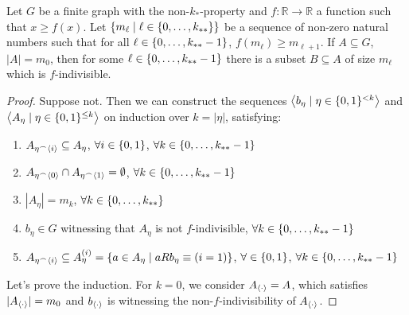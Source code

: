     \begin{lemma}[Claim 4.3] \label{lem:existance_of_indivisible_sets}
        Let $G$ be a finite graph with the non-$k_*$-property and $f: \mathbb{R} \longrightarrow \mathbb{R}$ a function
        such that $x \geq f(x)$.
        Let $\{ m_\ell \mid \ell \in \{ 0, \dots, k_{**} \} \}$ be a sequence of non-zero natural numbers such that
        for all $\ell \in \{ 0, \dots, k_{**}-1 \}$, $f(m_{\ell}) \geq m_{\ell+1}$.
        If $A \subseteq G$, $|A| = m_0$, then for some $\ell \in \{ 0, \dots, k_{**}-1 \}$ there is a subset $B \subseteq A$
        of size $m_\ell$ which is $f$-indivisible.
        \begin{proof}
            Suppose not.
            Then we can construct the sequences $\left< b_\eta \mid \eta \in \{ 0,1 \}^{<k} \right>$ and $\left< A_\eta \mid \eta \in \{ 0,1 \}^{\leq k} \right>$
            on induction over $k = |\eta|$, satisfying:
            \begin{enumerate}
                \item\label{itm:existance_of_indivisible_sets.1} $A_{\eta^\frown \left< i \right>} \subseteq A_{\eta}$, $\forall i \in \{ 0,1 \}$, $\forall k \in \{ 0, \dots, k_{**}-1 \}$
                \item\label{itm:existance_of_indivisible_sets.2} $A_{\eta^\frown \left< 0 \right>} \cap A_{\eta^\frown \left< 1 \right>} = \emptyset$, $\forall k \in \{ 0, \dots, k_{**}-1 \}$
                \item\label{itm:existance_of_indivisible_sets.3} $|A_\eta| = m_k$, $\forall k \in \{ 0, \dots, k_{**} \}$
                \item\label{itm:existance_of_indivisible_sets.4} $b_\eta \in G$ witnessing that $A_\eta$ is not $f$-indivisible, $\forall k \in \{ 0, \dots, k_{**}-1 \}$
                \item\label{itm:existance_of_indivisible_sets.5} $A_{\eta^\frown \left< i \right>} \subseteq A_\eta^{(i)} = \{ a \in A_\eta \mid a R b_\eta \equiv (i=1) \}$,
                    $\forall \in \{ 0,1 \}$, $\forall k \in \{ 0, \dots, k_{**}-1 \}$
            \end{enumerate}
            Let's prove the induction.
            For $k=0$, we consider $A_{\left< \cdot \right>} = A$, which satisfies $|A_{\left< \cdot \right>}| = m_0$ and
            $b_{\left< \cdot \right>}$ is witnessing the non-$f$-indivisibility of $A_{\left< \cdot \right>}$.

\end{proof}
\end{lemma}
